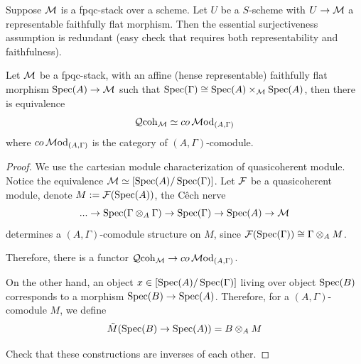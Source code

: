    Suppose $\mathcal{M}$ is a fpqc-stack over a scheme. Let $U$ be a $S$-scheme with $U\to \mathcal{M}$ a representable faithfully flat morphism. Then the essential surjectiveness assumption is redundant (easy check that requires both representability and faithfulness).

   \begin{proposition}
    Let $\mathcal{M}$ be a fpqc-stack, with an affine (hense representable) faithfully flat morphism $\operatorname{\mathrm{Spec}}(A)\to \mathcal{M}$ such that $\operatorname{\mathrm{Spec}}(\Gamma)\cong \operatorname{\mathrm{Spec}}(A)\times_{\mathcal{M}}\operatorname{\mathrm{Spec}}(A)$, then there is equivalence
    \[
        \operatorname{\mathcal{Q}coh}_{\mathcal{M}}\simeq co\operatorname{\mathcal{M}od}_{(A,\Gamma)}
    \]where $co\operatorname{\mathcal{M}od}_{(A,\Gamma)}$ is the category of $(A,\Gamma)$-comodule.
   \end{proposition}
   \begin{proof}
    We use the cartesian module characterization of quasicoherent module.
    Notice the equivalence $\mathcal{M}\simeq [\operatorname{\mathrm{Spec}}(A)/\operatorname{\mathrm{Spec}}(\Gamma)]$. Let $\mathcal{F}$ be a quasicoherent module, denote $M:=\mathcal{F}(\operatorname{\mathrm{Spec}}(A))$, the Cêch nerve 
    \[
    ...\to \operatorname{\mathrm{Spec}}(\Gamma\otimes_A\Gamma)\to \operatorname{\mathrm{Spec}}(\Gamma)\to \operatorname{\mathrm{Spec}}(A)\to \mathcal{M}
    \]determines a $(A,\Gamma)$-comodule structure on $M$, since $\mathcal{F}(\operatorname{\mathrm{Spec}}(\Gamma))\cong \Gamma\otimes_A M$.

    Therefore, there is a functor $ \operatorname{\mathcal{Q}coh}_{\mathcal{M}}\to co\operatorname{\mathcal{M}od}_{(A,\Gamma)}$. 

    On the other hand, an object $x\in [\operatorname{\mathrm{Spec}}(A)/ \operatorname{\mathrm{Spec}}(\Gamma)]$ living over object $\operatorname{\mathrm{Spec}}(B)$ corresponds to a morphism $\operatorname{\mathrm{Spec}}(B)\to \operatorname{\mathrm{Spec}}(A)$. Therefore, for a $(A,\Gamma)$-comodule $M$, we define
    \[
    \tilde{M}(\operatorname{\mathrm{Spec}}(B)\to \operatorname{\mathrm{Spec}}(A))=B\otimes_A M
    \]

    Check that these constructions are inverses of each other.
   \end{proof}

